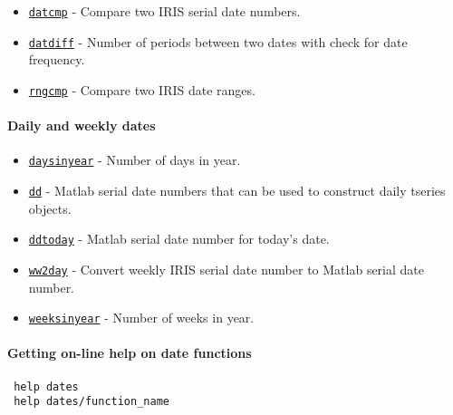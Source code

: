  \begin{itemize}
 \item
   \href{dates/datcmp}{\texttt{datcmp}} - Compare two IRIS serial date
   numbers.
 \item
   \href{dates/datdiff}{\texttt{datdiff}} - Number of periods between two
   dates with check for date frequency.
 \item
   \href{dates/rngcmp}{\texttt{rngcmp}} - Compare two IRIS date ranges.
 \end{itemize}
 
 \paragraph{Daily and weekly dates}
 
 \begin{itemize}
 \item
   \href{dates/daysinyear}{\texttt{daysinyear}} - Number of days in year.
 \item
   \href{dates/dd}{\texttt{dd}} - Matlab serial date numbers that can be
   used to construct daily tseries objects.
 \item
   \href{dates/ddtoday}{\texttt{ddtoday}} - Matlab serial date number for
   today's date.
 \item
   \href{dates/ww2day}{\texttt{ww2day}} - Convert weekly IRIS serial date
   number to Matlab serial date number.
 \item
   \href{dates/weeksinyear}{\texttt{weeksinyear}} - Number of weeks in
   year.
 \end{itemize}
 
 \paragraph{Getting on-line help on date functions}
 
 \begin{verbatim}
 help dates
 help dates/function_name
 \end{verbatim}



